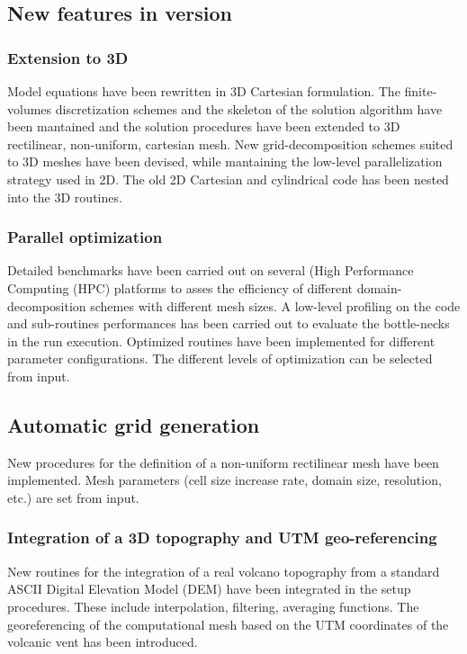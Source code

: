 \subsection{New features in version \PDACVERSION}

\subsubsection*{Extension to 3D}
Model equations have been rewritten in 3D Cartesian formulation. The
finite-volumes discretization schemes and the skeleton of the solution
algorithm have been mantained and the solution procedures have been extended
to 3D rectilinear, non-uniform, cartesian mesh.
New grid-decomposition schemes suited to 3D meshes have been devised, while
mantaining the low-level parallelization strategy used in 2D.
The old 2D Cartesian and cylindrical code has been nested into the 3D routines.

\subsubsection*{Parallel optimization}
Detailed benchmarks have been carried out on several (High Performance 
Computing (HPC) platforms to asses the efficiency of different 
domain-decomposition schemes with different mesh sizes. A low-level
profiling on the code and sub-routines performances has been carried out
to evaluate the bottle-necks in the run execution.
Optimized routines have been implemented for different parameter configurations.
The different levels of optimization can be selected from input.

\subsection*{Automatic grid generation}
New procedures for the definition of a non-uniform rectilinear mesh
have been implemented. Mesh parameters (cell size increase rate, domain
size, resolution, etc.) are set from input.

\subsubsection*{Integration of a 3D topography and UTM geo-referencing}
New routines for the integration of a real volcano topography from a 
standard ASCII Digital Elevation Model (DEM) have been integrated in the
setup procedures. These include interpolation, filtering, averaging
functions. The georeferencing of the computational mesh based on the 
UTM coordinates of the volcanic vent has been introduced.


